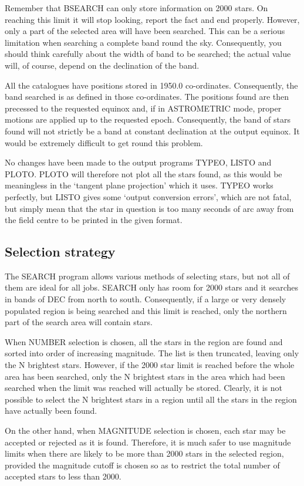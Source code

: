 Remember that BSEARCH can only store information on 2000 stars.
On reaching this limit it will stop looking, report the fact and end properly.
However, only a part of the selected area will have been searched.
This can be a serious limitation when searching a complete band round the sky.
Consequently, you should think carefully about the width of band to be searched;
the actual value will, of course, depend on the declination of the band.

All the catalogues have positions stored in 1950.0 co-ordinates.
Consequently, the band searched is as defined in those co-ordinates.
The positions found are then precessed to the requested equinox and, if in
ASTROMETRIC mode, proper motions are applied up to the requested epoch.
Consequently, the band of stars found will not strictly be a band at constant
declination at the output equinox.
It would be extremely difficult to get round this problem.

No changes have been made to the output programs TYPEO, LISTO and PLOTO.
PLOTO will therefore not plot all the stars found, as this would be meaningless
in the `tangent plane projection' which it uses.
TYPEO works perfectly, but LISTO gives some `output conversion errors', which
are not fatal, but simply mean that the star in question is too many seconds of
arc away from the field centre to be printed in the given format.
\subsection{Selection strategy}
The SEARCH program allows various methods of selecting stars, but not all of
them are ideal for all jobs.
SEARCH only has room for 2000 stars and it searches in bands of DEC from north
to south.
Consequently, if a large or very densely populated region is being searched and
this limit is reached, only the northern part of the search area will contain
stars.

When NUMBER selection is chosen, all the stars in the region are found and
sorted into order of increasing magnitude.
The list is then truncated, leaving only the N brightest stars.
However, if the 2000 star limit is reached before the whole area has been
searched, only the N brightest stars in the area which had been searched when
the limit was reached will actually be stored.
Clearly, it is not possible to select the N brightest stars in a region until
all the stars in the region have actually been found.

On the other hand, when MAGNITUDE selection is chosen, each star may be
accepted or rejected as it is found.
Therefore, it is much safer to use magnitude limits when there are likely to be
more than 2000 stars in the selected region, provided the magnitude cutoff is
chosen so as to restrict the total number of accepted stars to less than 2000.

